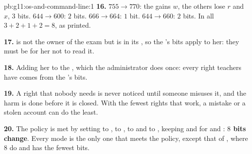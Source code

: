 \begin{solution}{pb:g11:os-and-command-line:1}
\textbf{16.} $755 \to 770$: the  gains $w$, the others lose $r$ and $x$, $3$ bits. $644 \to 600$: $2$ bits.
$666 \to 664$: $1$ bit. $644 \to 660$: $2$ bits. In all $3 + 2 + 1 + 2 = 8$, as printed.

\textbf{17.}  is not the owner of the exam but is in its , so the 's bits apply to her: they must
be \code{---} for her not to read it.

\textbf{18.} Adding her to the  , which the administrator does once: every right teachers have
comes from the 's bits.

\textbf{19.} A right that nobody needs is never noticed until someone misuses it, and the harm is done before it is
closed. With the fewest rights that work, a mistake or a stolen account can do the least.

\textbf{20.} The policy is met by setting  to ,  to ,
 to  and  to , keeping  and  for
 and : \textbf{$8$  bits change}. Every mode is the only one that meets the
policy, except that of , where $8$ do and  has the fewest bits.
\end{solution}
